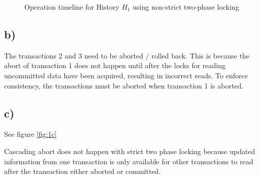 \documentclass{scrartcl}
\begin{document}
\begin{figure}[!ht]
	\caption{Operation timeline for History \(H_1\) using non-strict two-phase locking}
	\label{fig:1a}
\end{figure}

\subsection*{b)}

The transactions 2 and 3 need to be aborted / rolled back.
This is because the abort of transaction 1 does not happen until after the locks for reading uncommitted data have been acquired, resulting in incorrect reads.
To enforce consistency, the transactions must be aborted when transaction 1 is aborted.

\subsection*{c)}

See figure \ref{fig:1c}

Cascading abort does not happen with strict two phase locking because updated information from one transaction is only available for other transactions to read after the transaction either aborted or committed.
\end{document}
